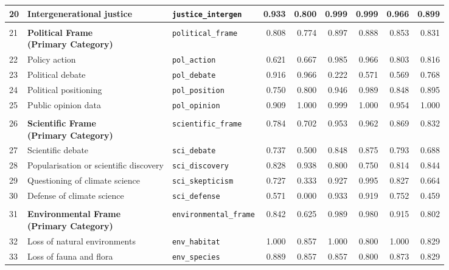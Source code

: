 \begin{longtable}{p{0.4cm}p{4.0cm}p{3.0cm}rrrrrr}
20 & Intergenerational justice & \texttt{justice\_intergen} & 0.933 & 0.800 & 0.999 & 0.999 & 0.966 & 0.899 \\
\midrule
\rowcolor{gray!8}
\multicolumn{9}{l}{\textit{Political Frame}} \\
\midrule
21 & \textbf{Political Frame\newline (Primary Category)} & \texttt{political\_frame} & 0.808 & 0.774 & 0.897 & 0.888 & 0.853 & 0.831 \\
\cmidrule(lr){1-9}
22 & Policy action & \texttt{pol\_action} & 0.621 & 0.667 & 0.985 & 0.966 & 0.803 & 0.816 \\
23 & Political debate & \texttt{pol\_debate} & 0.916 & 0.966 & 0.222 & 0.571 & 0.569 & 0.768 \\
24 & Political positioning & \texttt{pol\_position} & 0.750 & 0.800 & 0.946 & 0.989 & 0.848 & 0.895 \\
25 & Public opinion data & \texttt{pol\_opinion} & 0.909 & 1.000 & 0.999 & 1.000 & 0.954 & 1.000 \\
\midrule
\rowcolor{gray!8}
\multicolumn{9}{l}{\textit{Scientific Frame}} \\
\midrule
26 & \textbf{Scientific Frame\newline (Primary Category)} & \texttt{scientific\_frame} & 0.784 & 0.702 & 0.953 & 0.962 & 0.869 & 0.832 \\
\cmidrule(lr){1-9}
27 & Scientific debate & \texttt{sci\_debate} & 0.737 & 0.500 & 0.848 & 0.875 & 0.793 & 0.688 \\
28 & Popularisation or scientific discovery & \texttt{sci\_discovery} & 0.828 & 0.938 & 0.800 & 0.750 & 0.814 & 0.844 \\
29 & Questioning of climate science & \texttt{sci\_skepticism} & 0.727 & 0.333 & 0.927 & 0.995 & 0.827 & 0.664 \\
30 & Defense of climate science & \texttt{sci\_defense} & 0.571 & 0.000 & 0.933 & 0.919 & 0.752 & 0.459 \\
\midrule
\rowcolor{gray!8}
\multicolumn{9}{l}{\textit{Environmental Frame}} \\
\midrule
31 & \textbf{Environmental Frame\newline (Primary Category)} & \texttt{environmental\_frame} & 0.842 & 0.625 & 0.989 & 0.980 & 0.915 & 0.802 \\
\cmidrule(lr){1-9}
32 & Loss of natural environments & \texttt{env\_habitat} & 1.000 & 0.857 & 1.000 & 0.800 & 1.000 & 0.829 \\
33 & Loss of fauna and flora & \texttt{env\_species} & 0.889 & 0.857 & 0.857 & 0.800 & 0.873 & 0.829 \\

\end{longtable}

